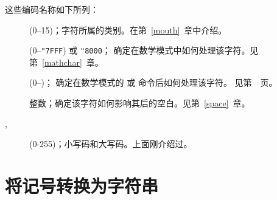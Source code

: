 \documentclass{book}
\begin{document}
这些编码名称如下所列：
\begin{description}\item []
 (0--15)；字符所属的类别。在第~\ref{mouth}~章中介绍。
\item []
 (0--\verb-"7FFF-) 或 \verb-"8000-；
确定在数学模式中如何处理该字符。见第~\ref{mathchar}~章。
\item []
 (0--)；
确定在数学模式的  或  命令后如何处理该字符。
见第~\pageref{delcodes}~页。
\item []
整数；确定该字符如何影响其后的空白。见第~\ref{space}~章。
\item [, ]
 (0-255)；小写码和大写码。上面刚介绍过。
\end{description}

\section{将记号转换为字符串}
\end{document}
